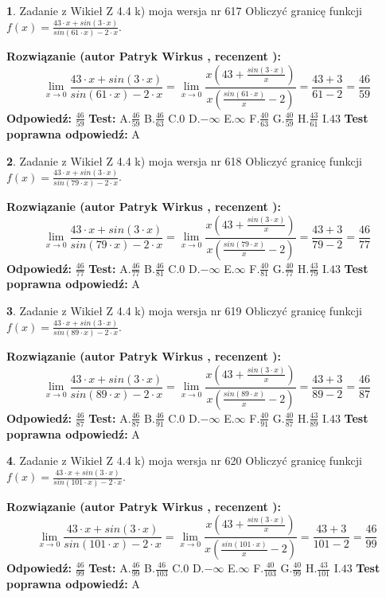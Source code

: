 \documentclass[12pt, a4paper]{article}
\theoremstyle{definition} %
\newtheorem{zad}{}
\newcommand{\zadStart}[1]{\begin{zad}#1\newline}
\newcommand{\zadStop}{\end{zad}}
\newcommand{\rozwStart}[2]{\noindent \textbf{Rozwiązanie (autor #1 , recenzent #2): }\newline}
\newcommand{\rozwStop}{\newline}
\newcommand{\odpStart}{\noindent \textbf{Odpowiedź:}\newline}
\newcommand{\odpStop}{\newline}
\newcommand{\testStart}{\noindent \textbf{Test:}\newline}
\newcommand{\testStop}{\newline}
\newcommand{\kluczStart}{\noindent \textbf{Test poprawna odpowiedź:}\newline}
\newcommand{\kluczStop}{\newline}
\begin{document}
\zadStart{Zadanie z Wikieł Z 4.4 k) moja wersja nr 617}
Obliczyć granicę funkcji $f(x)=\frac{43\cdot x +sin(3\cdot x)}{sin(61\cdot x) -2\cdot x}$.
\zadStop
\rozwStart{Patryk Wirkus}{}
$$\lim\limits_{x\to 0}\frac{43\cdot x +sin(3\cdot x)}{sin(61\cdot x) -2\cdot x}
=\lim\limits_{x\to 0}\frac{x(43+\frac{sin(3\cdot x)}{x})}{x(\frac{sin(61\cdot x)}{x}-2)}
=\frac{43+3}{61-2} = \frac{46}{59}$$
\rozwStop
\odpStart
$\frac{46}{59}$
\odpStop
\testStart
A.$\frac{46}{59}$
B.$\frac{46}{63}$
C.$0$
D.$-\infty$
E.$\infty$
F.$\frac{40}{63}$
G.$\frac{40}{59}$
H.$\frac{43}{61}$
I.$43$
\testStop
\kluczStart
A
\kluczStop



\zadStart{Zadanie z Wikieł Z 4.4 k) moja wersja nr 618}
Obliczyć granicę funkcji $f(x)=\frac{43\cdot x +sin(3\cdot x)}{sin(79\cdot x) -2\cdot x}$.
\zadStop
\rozwStart{Patryk Wirkus}{}
$$\lim\limits_{x\to 0}\frac{43\cdot x +sin(3\cdot x)}{sin(79\cdot x) -2\cdot x}
=\lim\limits_{x\to 0}\frac{x(43+\frac{sin(3\cdot x)}{x})}{x(\frac{sin(79\cdot x)}{x}-2)}
=\frac{43+3}{79-2} = \frac{46}{77}$$
\rozwStop
\odpStart
$\frac{46}{77}$
\odpStop
\testStart
A.$\frac{46}{77}$
B.$\frac{46}{81}$
C.$0$
D.$-\infty$
E.$\infty$
F.$\frac{40}{81}$
G.$\frac{40}{77}$
H.$\frac{43}{79}$
I.$43$
\testStop
\kluczStart
A
\kluczStop



\zadStart{Zadanie z Wikieł Z 4.4 k) moja wersja nr 619}
Obliczyć granicę funkcji $f(x)=\frac{43\cdot x +sin(3\cdot x)}{sin(89\cdot x) -2\cdot x}$.
\zadStop
\rozwStart{Patryk Wirkus}{}
$$\lim\limits_{x\to 0}\frac{43\cdot x +sin(3\cdot x)}{sin(89\cdot x) -2\cdot x}
=\lim\limits_{x\to 0}\frac{x(43+\frac{sin(3\cdot x)}{x})}{x(\frac{sin(89\cdot x)}{x}-2)}
=\frac{43+3}{89-2} = \frac{46}{87}$$
\rozwStop
\odpStart
$\frac{46}{87}$
\odpStop
\testStart
A.$\frac{46}{87}$
B.$\frac{46}{91}$
C.$0$
D.$-\infty$
E.$\infty$
F.$\frac{40}{91}$
G.$\frac{40}{87}$
H.$\frac{43}{89}$
I.$43$
\testStop
\kluczStart
A
\kluczStop



\zadStart{Zadanie z Wikieł Z 4.4 k) moja wersja nr 620}
Obliczyć granicę funkcji $f(x)=\frac{43\cdot x +sin(3\cdot x)}{sin(101\cdot x) -2\cdot x}$.
\zadStop
\rozwStart{Patryk Wirkus}{}
$$\lim\limits_{x\to 0}\frac{43\cdot x +sin(3\cdot x)}{sin(101\cdot x) -2\cdot x}
=\lim\limits_{x\to 0}\frac{x(43+\frac{sin(3\cdot x)}{x})}{x(\frac{sin(101\cdot x)}{x}-2)}
=\frac{43+3}{101-2} = \frac{46}{99}$$
\rozwStop
\odpStart
$\frac{46}{99}$
\odpStop
\testStart
A.$\frac{46}{99}$
B.$\frac{46}{103}$
C.$0$
D.$-\infty$
E.$\infty$
F.$\frac{40}{103}$
G.$\frac{40}{99}$
H.$\frac{43}{101}$
I.$43$
\testStop
\kluczStart
A
\kluczStop
\end{document}
